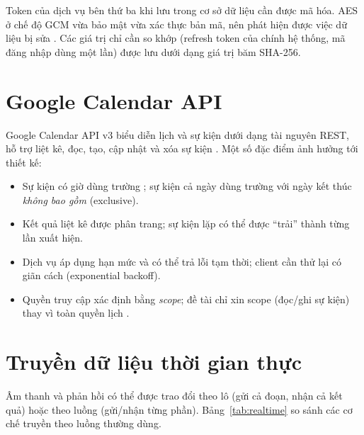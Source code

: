 Token của dịch vụ bên thứ ba khi lưu trong cơ sở dữ liệu cần được mã hóa. AES ở chế độ GCM vừa bảo mật vừa xác thực bản mã, nên phát hiện được việc dữ liệu bị sửa \cite{nistgcm}. Các giá trị chỉ cần so khớp (refresh token của chính hệ thống, mã đăng nhập dùng một lần) được lưu dưới dạng giá trị băm SHA-256.

\section{Google Calendar API}
Google Calendar API v3 biểu diễn lịch và sự kiện dưới dạng tài nguyên REST, hỗ trợ liệt kê, đọc, tạo, cập nhật và xóa sự kiện \cite{gcalapi,gcalevents}. Một số đặc điểm ảnh hưởng tới thiết kế:
\begin{itemize}
  \item Sự kiện có giờ dùng trường ; sự kiện cả ngày dùng trường  với ngày kết thúc \textit{không bao gồm} (exclusive).
  \item Kết quả liệt kê được phân trang; sự kiện lặp có thể được “trải” thành từng lần xuất hiện.
  \item Dịch vụ áp dụng hạn mức và có thể trả lỗi tạm thời; client cần thử lại có giãn cách (exponential backoff).
  \item Quyền truy cập xác định bằng \textit{scope}; đề tài chỉ xin scope  (đọc/ghi sự kiện) thay vì toàn quyền lịch \cite{gcalscopes}.
\end{itemize}

\section{Truyền dữ liệu thời gian thực}
Âm thanh và phản hồi có thể được trao đổi theo lô (gửi cả đoạn, nhận cả kết quả) hoặc theo luồng (gửi/nhận từng phần). Bảng~\ref{tab:realtime} so sánh các cơ chế truyền theo luồng thường dùng.

